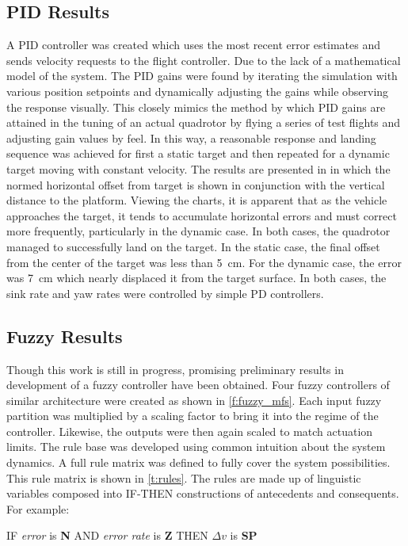 \documentclass[]{aiaa-tc}
\begin{document}
\subsection{PID Results}
A PID controller was created which uses the most recent error estimates and sends velocity requests to the flight controller. Due to the lack of a mathematical model of the system. The PID gains were found by iterating the simulation with various position setpoints and dynamically adjusting the gains while observing the response visually. This closely mimics the method by which PID gains are attained in the tuning of an actual quadrotor by flying a series of test flights and adjusting gain values by feel. In this way, a reasonable response and landing sequence was achieved for first a static target and then repeated for a dynamic target moving with constant velocity. The results are presented in  in which the normed horizontal offset from target is shown in conjunction with the vertical distance to the platform. Viewing the charts, it is apparent that as the vehicle approaches the target, it tends to accumulate horizontal errors and must correct more frequently, particularly in the dynamic case. In both cases, the quadrotor managed to successfully land on the target. In the static case, the final offset from the center of the target was less than \SI{5}{\cm}. For the dynamic case, the error was \SI{7}{\cm} which nearly displaced it from the target surface. In both cases, the sink rate and yaw rates were controlled by simple PD controllers.



\subsection{Fuzzy Results}
Though this work is still in progress, promising preliminary results in development of a fuzzy controller have been obtained. Four fuzzy controllers of similar architecture were created as shown in \cref{f:fuzzy_mfs}. Each input fuzzy partition was multiplied by a scaling factor to bring it into the regime of the controller. Likewise, the outputs were then again scaled to match actuation limits. The rule base was developed using common intuition about the system dynamics. A full rule matrix was defined to fully cover the system possibilities. This rule matrix is shown in \cref{t:rules}. The rules are made up of linguistic variables composed into IF-THEN constructions of antecedents and consequents. For example:
\begin{center}
IF \emph{error} is \textbf{N} AND \emph{error rate} is \textbf{Z} THEN \emph{$\Delta v$} is \textbf{SP}
\end{center}
\end{document}
